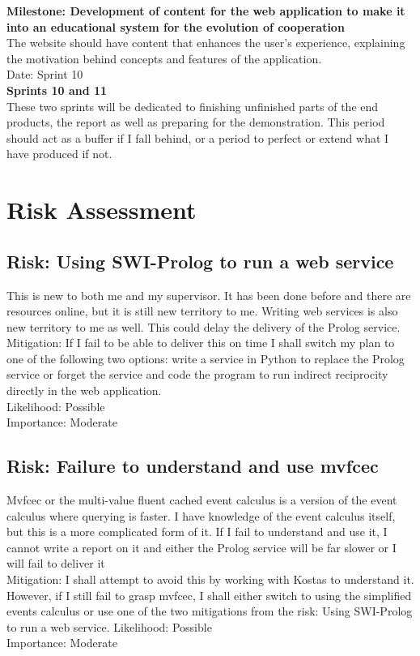 \documentclass{article}
\begin{document}
\noindent\textbf{Milestone: Development of content for the web application to make it into an educational system for the evolution of cooperation}\\
The website should have content that enhances the user's experience, explaining the motivation behind concepts and features of the application.\\
Date: Sprint 10\\

\noindent\textbf{Sprints 10 and 11}\\
These two sprints will be dedicated to finishing unfinished parts of the end products, the report as well as preparing for the demonstration. This period should act as a buffer if I fall behind, or a period to perfect or extend what I have produced if not.

\section*{Risk Assessment}

\subsection*{Risk: Using SWI-Prolog to run a web service}
This is new to both me and my supervisor. It has been done before and there are resources online, but it is still new territory to me. Writing web services is also new territory to me as well. This could delay the delivery of the Prolog service.\\
Mitigation: If I fail to be able to deliver this on time I shall switch my plan to one of the following two options: write a service in Python to replace the Prolog service or forget the service and code the program to run indirect reciprocity directly in the web application.\\
Likelihood: Possible\\
Importance: Moderate

\subsection*{Risk: Failure to understand and use mvfcec}
Mvfcec or the multi-value fluent cached event calculus is a version of the event calculus where querying is faster. I have knowledge of the event calculus itself, but this is a more complicated form of it. If I fail to understand and use it, I cannot write a report on it and either the Prolog service will be far slower or I will fail to deliver it\\
Mitigation: I shall attempt to avoid this by working with Kostas to understand it. However, if I still fail to grasp mvfcec, I shall either switch to using the simplified events calculus or use one of the two mitigations from the risk: Using SWI-Prolog to run a web service.
Likelihood: Possible\\
Importance: Moderate
\end{document}
